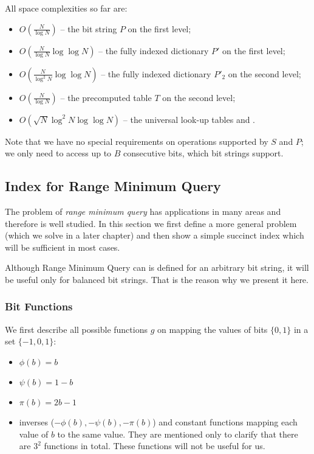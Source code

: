 \bigskip

All space complexities so far are:
\begin{itemize}
	\item $O(\frac{N}{\log N})$ -- the bit string $P$ on the first level;
	\item $O(\frac{N}{\log N}\log \log N)$ -- the fully indexed dictionary $P'$ on the first level;
	\item $O(\frac{N}{\log^2 N}\log \log N)$ -- the fully indexed dictionary $P'_2$ on the second level;
	\item $O(\frac{N}{\log N})$ -- the precomputed table $T$ on the second level;
	\item $O(\sqrt{N}\log^2 N \log\log N)$ -- the universal look-up tables \fwdSearch{} and \bwdSearch{}.
\end{itemize}
Note that we have no special requirements on operations supported by $S$ and $P$; we only need to access up to $B$ consecutive bits, which bit strings support.

\subsection{Index for Range Minimum Query}

The problem of \emph{range minimum query} has applications in many areas and therefore is well studied. 
In this section we first define a more general problem (which we solve in a later chapter) and then show a simple succinct index which will be sufficient in most cases.

Although Range Minimum Query can is defined for an arbitrary bit string, it will be useful only for balanced bit strings.
That is the reason why we present it here.

\subsubsection{Bit Functions}

We first describe all possible functions $g$ on mapping the values of bits $\{0, 1\}$ in a set $\{-1, 0, 1\}$:
\begin{itemize}
	\item $\phi(b) = b$
	\item $\psi(b) = 1 - b$
	\item $\pi(b) = 2 b - 1$
	\item inverses ($-\phi(b), -\psi(b), -\pi(b)$) and constant functions mapping each value of $b$ to the same value.
	They are mentioned only to clarify that there are $3^2$ functions in total.
	These functions will not be useful for us.
\end{itemize}

